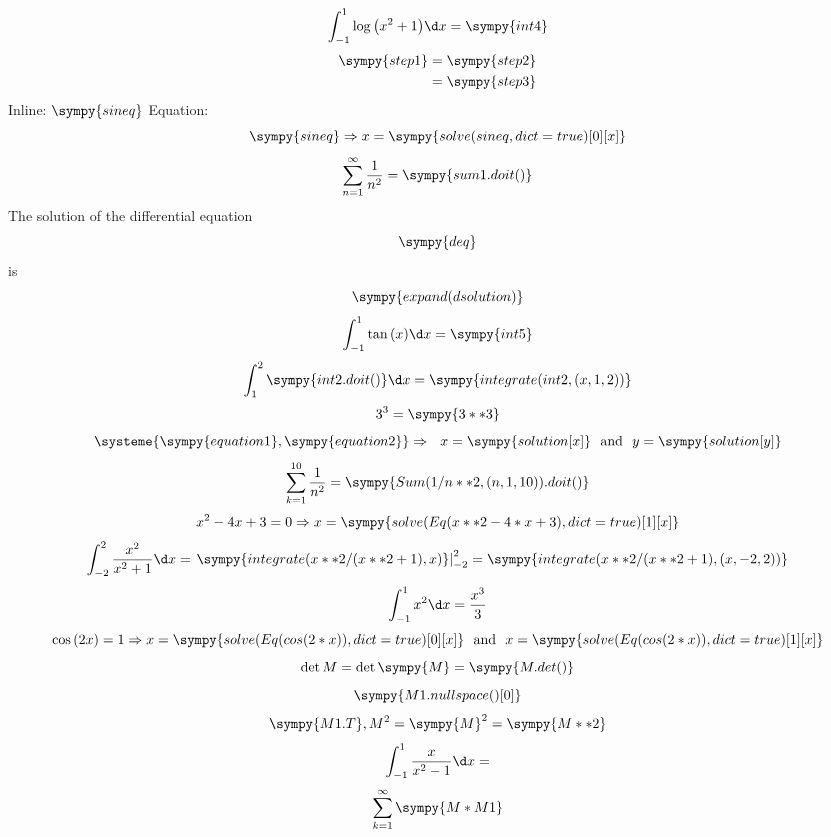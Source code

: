 \documentclass[a4paper,11pt]{article}
\begin{document}
\[ \int_{-1}^{1}{\log{\left(x^2+1\right)}\d x}=\sympy{int4} \]
\begin{align*}
\sympy{step1} &= \sympy{step2} \\
&= \sympy{step3}
\end{align*}
Inline: $\sympy{sineq}$
Equation: \[ \sympy{sineq}\Rightarrow x=\sympy{solve(sineq,dict=true)[0][x]} \]
\[ \sum_{n=1}^{\infty}\frac{1}{n^2}=\sympy{sum1.doit()} \]
The solution of the differential equation
\[ \sympy{deq} \]
is
\[ \sympy{expand(dsolution)} \]
\[ \int_{-1}^{1}{\tan{(x)}\d x}=\sympy{int5} \]
\[ \int_{1}^{2}{\sympy{int2.doit()}\d x}=\sympy{integrate(int2,(x,1,2))} \]
\[ 3^3=\sympy{3**3} \]
\[ \systeme{\sympy{equation1},\sympy{equation2}}\Rightarrow \ \ x=\sympy{solution[x]}\ \ \textrm{and}\ \ y=\sympy{solution[y]} \]
\[ \sum_{k=1}^{10}{\frac{1}{n^2}}=\sympy{Sum(1/n**2,(n,1,10)).doit()} \]
\[ x^2-4x+3=0\Rightarrow x=\sympy{solve(Eq(x**2-4*x+3),dict=true)[1][x]} \]
\[ \int_{-2}^{2}{\frac{x^2}{x^2+1}\d x}=\left.\sympy{integrate(x**2/(x**2+1),x)}\right|_{-2}^{2}=\sympy{integrate(x**2/(x**2+1),(x,-2,2))} \]
\[ \int_{-1}^{1}{x^2\d x}=\frac{x^3}{3} \]
\[ \cos{(2x)}=1\Rightarrow x=\sympy{solve(Eq(cos(2*x)),dict=true)[0][x]}\ \ \textrm{and}\ \ x=\sympy{solve(Eq(cos(2*x)),dict=true)[1][x]} \]
\[ \det{M}=\det{\sympy{M}}=\sympy{M.det()} \]
\[ \sympy{M1.nullspace()[0]} \]
\[ \sympy{M1.T},M^2=\sympy{M}^2=\sympy{M**2} \]
\[ \int_{-1}^{1}{\frac{x}{x^2-1}\d x}= \]
\[ \sum_{k=1}^{\infty}{\sympy{M*M1}} \]
\end{document}
